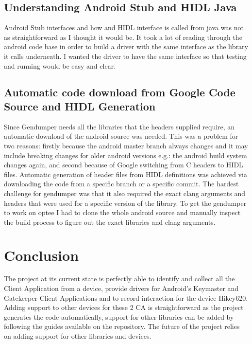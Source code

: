 \documentclass[a4paper,11pt,oneside]{article}
\begin{document}
\subsection{Understanding Android Stub and HIDL Java}
Android Stub interfaces and how and HIDL interface
is called from java was not as straightforward as I
thought it would be. It took a lot of reading through
the android code base in order to build a driver with
the same interface as the library it calls underneath.
I wanted the driver to have the same interface so that testing and running would be easy and clear.
\subsection{Automatic code download from Google Code Source and HIDL Generation}
\label{sub:HIDL}
Since Gendumper needs all the libraries that the
headers supplied require, an automatic download of
the android source was needed. This was a problem for
two reasons: firstly because the android master branch always changes and it may include breaking changes for
older android versions e.g.: the android build system changes again, and second because of Google switching from C headers to HIDL files. Automatic generation of header files from HIDL definitions was achieved via downloading the code from a specific branch or a specific commit. The hardest challenge for gendumper was that it also required the exact clang arguments and headers that were used for a specific version of the library. To get the gendumper to work on optee I had to
clone the whole android source and manually inspect the build process to figure out the exact libraries and clang arguments.
\section{Conclusion}
The project at its current state is perfectly able to
identify and collect all the Client Application from a device,
provide drivers for Android's Keymaster and Gatekeeper Client Applications and to record interaction for the device Hikey620. Adding support to other devices for these 2 CA is straightforward as the project generates the code automatically, support for other libraries can be added by following the guides available on the repository. The future of the project relies on adding support for other libraries and devices.

\cleardoublepage
{}
{}
\printbibliography

%
%
\end{document}
